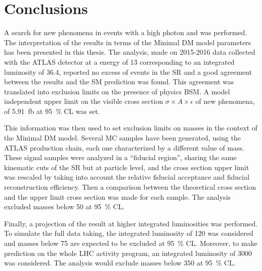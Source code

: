 \chapter{Conclusions}
\lettrine{A}{} search for new phenomena in events with a high \ET photon and \met was performed. The interpretation of the results in terms of the Minimal DM model parameters has been presented in this thesis.
The analysis, made on 2015-2016 data collected with the ATLAS detector at a \cm energy of \SI{13}{\tev} corresponding to an integrated luminosity of \SI{36.4}{\ifb}, reported no excess of events in the SR and a good agreement between the results and the SM prediction was found. 
This agreement was translated into exclusion limits on the presence of physics BSM. A model independent upper limit on the visible cross section $\sigma\times A\times\epsilon$ of new phenomena, of \SI{5.91}{fb} at \SI{95}{\percent} CL was set.

This information was then used to set exclusion limits on \chizero masses in the context of the Minimal DM model. Several MC samples have been generated, using the ATLAS production chain, each one characterized by a different value of \chizero mass. These signal samples were analyzed in a ``fiducial region'', sharing the same kinematic cuts of the SR but at particle level, and the cross section upper limit was rescaled by taking into account the relative fiducial acceptance and fiducial reconstruction efficiency. Then a comparison between the theoretical cross section and the upper limit cross section was made for each sample. The \mph analysis excluded masses below \SI{50}{\gev} at \SI{95}{\percent} CL.

Finally, a projection of the result at higher integrated luminosities was performed. To simulate the full \RunTwo data taking, the integrated luminosity of \SI{120}{\ifb} was considered and masses below \SI{75}{\gev} are expected to be excluded at \SI{95}{\percent} CL. Moreover, to make prediction on the whole LHC activity program, an integrated luminosity of \SI{3000}{\ifb} was considered. The \mph analysis would exclude masses below \SI{350}{\gev} at \SI{95}{\percent} CL.



